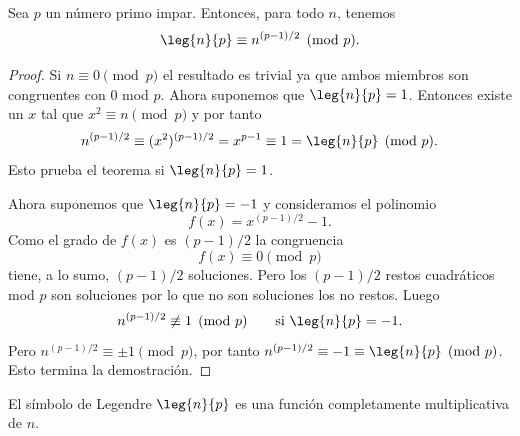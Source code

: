 \documentclass[12pt,a4paper]{book}
\begin{document}
    \begin{teorema}\label{teo:9-2}
        Sea $p$ un número primo impar. Entonces, para todo $n$, tenemos
        \begin{equation*}
            \leg{n}{p}\equiv n^{(p-1)/2}\pmod{p}.
        \end{equation*}
    \end{teorema}

    \begin{proof}
        Si $n\equiv0\pmod{p}$ el resultado es trivial ya que ambos miembros son congruentes
        con 0 mod $p$. Ahora suponemos que $\leg{n}{p}=1$. Entonces existe un $x$ tal que
        $x^{2}\equiv n\pmod{p}$ y por tanto
        \begin{equation*}
            n^{(p-1)/2}\equiv(x^{2})^{(p-1)/2}=x^{p-1}\equiv1=\leg{n}{p}\pmod{p}.
        \end{equation*}
        Esto prueba el teorema si $\leg{n}{p}=1$.

        Ahora suponemos que $\leg{n}{p}=-1$ y consideramos el polinomio
        \begin{equation*}
            f(x)=x^{(p-1)/2}-1.
        \end{equation*}
        Como el grado de $f(x)$ es $(p-1)/2$ la congruencia
        \begin{equation*}
            f(x)\equiv0\pmod{p}
        \end{equation*}
        tiene, a lo sumo, $(p-1)/2$ soluciones. Pero los $(p-1)/2$ restos cuadráticos mod
        $p$ son soluciones por lo que no son soluciones los no restos. Luego
        \begin{equation*}
            n^{(p-1)/2}\not\equiv1\pmod{p}\qquad\text{si }\leg{n}{p}=-1.
        \end{equation*}
        Pero $n^{(p-1)/2}\equiv\pm1\pmod{p}$, por tanto $n^{(p-1)/2}\equiv-1\equiv\leg{n}{p}
        \pmod{p}$. Esto termina la demostración.
    \end{proof}

    \begin{teorema}\label{teo:9-3}
        El símbolo de Legendre $\leg{n}{p}$ es una función completamente multiplicativa
        de $n$.
    \end{teorema}
\end{document}
